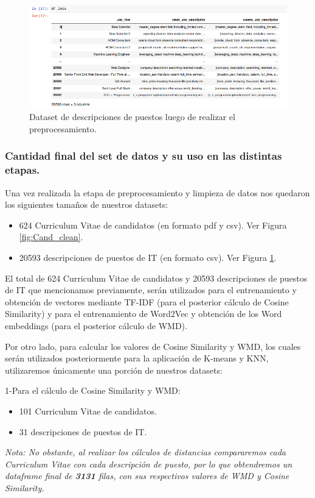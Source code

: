 \documentclass[12pt,a4paper]{article}
\begin{document}
\begin{sloppypar}
\begin{figure}[H]    
 \centering
 \includegraphics[width=1\textwidth]{images/Implementacion/7-DS_Jobs_Clean}
 \captionsetup{justification=centering,margin=3cm}
 \caption{Dataset de descripciones de puestos luego de realizar el preprocesamiento.}
 \label{fig:Desc_clean}
\end{figure}

\cleardoublepage

\subsubsection{Cantidad final del set de datos y su uso en las distintas etapas.}\label{etapas_set_datos}

Una vez realizada la etapa de preprocesamiento y limpieza de datos nos quedaron los siguientes tamaños de nuestros datasets:
\begin{itemize}
\item 624 Curriculum Vitae de candidatos (en formato pdf y csv). Ver Figura \ref{fig:Cand_clean}.
\item 20593 descripciones de puestos de IT (en formato csv). Ver Figura \ref{fig:Desc_clean}.
\end{itemize}

El total de 624 Curriculum Vitae de candidatos y 20593 descripciones de puestos de IT que mencionamos previamente, serán utilizados para el entrenamiento y obtención de vectores mediante TF-IDF (para el posterior cálculo de Cosine Similarity) y para el entrenamiento de Word2Vec y obtención de los Word embeddings (para el posterior cálculo de WMD).

Por otro lado, para calcular los valores de Cosine Similarity y WMD, los cuales serán utilizados posteriormente para la aplicación de K-means y KNN, utilizaremos únicamente una porción de nuestros datasets:

1-Para el cálculo de Cosine Similarity y WMD:
\begin{itemize}
\item 101 Curriculum Vitae de candidatos.
\item 31 descripciones de puestos de IT.
\end{itemize}
\textit{Nota: No obstante, al realizar los cálculos de distancias compararemos cada Curriculum Vitae con cada descripción de puesto, por lo que obtendremos un dataframe final de \textbf{3131} filas, con sus respectivos valores de WMD y Cosine Similarity.}


\end{sloppypar}
\end{document}
